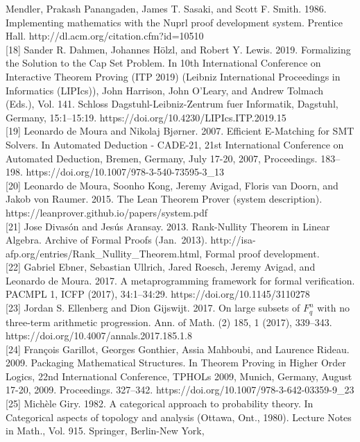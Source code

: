 \documentclass[
]{article}
\begin{document}
Mendler, Prakash Panangaden, James T. Sasaki, and Scott F. Smith. 1986.
Implementing mathematics with the Nuprl proof development system.
Prentice Hall. http://dl.acm.org/citation.cfm?id=10510\\
{[}18{]} Sander R. Dahmen, Johannes Hölzl, and Robert Y. Lewis. 2019.
Formalizing the Solution to the Cap Set Problem. In 10th International
Conference on Interactive Theorem Proving (ITP 2019) (Leibniz
International Proceedings in Informatics (LIPIcs)), John Harrison, John
O'Leary, and Andrew Tolmach (Eds.), Vol. 141. Schloss
Dagstuhl-Leibniz-Zentrum fuer Informatik, Dagstuhl, Germany,
15:1--15:19. https://doi.org/10.4230/LIPIcs.ITP.2019.15\\
{[}19{]} Leonardo de Moura and Nikolaj Bjørner. 2007. Efficient
E-Matching for SMT Solvers. In Automated Deduction - CADE-21, 21st
International Conference on Automated Deduction, Bremen, Germany, July
17-20, 2007, Proceedings. 183--198.
https://doi.org/10.1007/978-3-540-73595-3\_13\\
{[}20{]} Leonardo de Moura, Soonho Kong, Jeremy Avigad, Floris van
Doorn, and Jakob von Raumer. 2015. The Lean Theorem Prover (system
description). https://leanprover.github.io/papers/system.pdf\\
{[}21{]} Jose Divasón and Jesús Aransay. 2013. Rank-Nullity Theorem in
Linear Algebra. Archive of Formal Proofs (Jan.~2013).
http://isa-afp.org/entries/Rank\_Nullity\_Theorem.html, Formal proof
development.\\
{[}22{]} Gabriel Ebner, Sebastian Ullrich, Jared Roesch, Jeremy Avigad,
and Leonardo de Moura. 2017. A metaprogramming framework for formal
verification. PACMPL 1, ICFP (2017), 34:1--34:29.
https://doi.org/10.1145/3110278\\
{[}23{]} Jordan S. Ellenberg and Dion Gijswijt. 2017. On large subsets
of \(F_{q}^{n}\) with no three-term arithmetic progression. Ann. of
Math. (2) 185, 1 (2017), 339--343.
https://doi.org/10.4007/annals.2017.185.1.8\\
{[}24{]} François Garillot, Georges Gonthier, Assia Mahboubi, and
Laurence Rideau. 2009. Packaging Mathematical Structures. In Theorem
Proving in Higher Order Logics, 22nd International Conference, TPHOLs
2009, Munich, Germany, August 17-20, 2009. Proceedings. 327--342.
https://doi.org/10.1007/978-3-642-03359-9\_23\\
{[}25{]} Michèle Giry. 1982. A categorical approach to probability
theory. In Categorical aspects of topology and analysis (Ottawa, Ont.,
1980). Lecture Notes in Math., Vol. 915. Springer, Berlin-New York,
\end{document}
